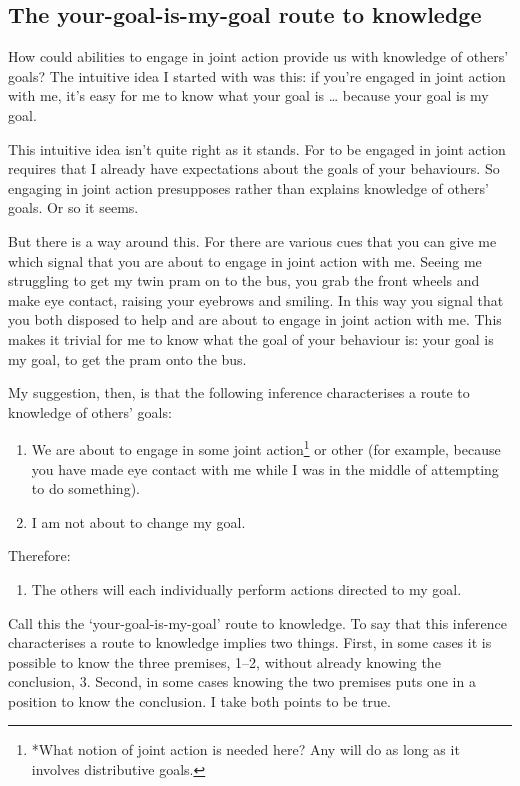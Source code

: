 \documentclass[12pt,a4paper]{extarticle}
\begin{document}
\subsection{The your-goal-is-my-goal route to knowledge}

How could abilities to engage in joint action provide us with knowledge of others’ goals?   The intuitive idea I started with was this: if you’re engaged in joint action with me, it’s easy for me to know what your goal is … because your goal is my goal.  

This intuitive idea isn’t quite right as it stands.  For to be engaged in joint action requires that I already have expectations about the goals of your behaviours.  
So engaging in joint action presupposes rather than explains knowledge of others’ goals.  Or so it seems.

But there is a way around this.  For there are various cues that you can give me which signal that you are about to engage in joint action with me.  Seeing me struggling to get my twin pram on to the bus, you grab the front wheels and make eye contact, raising your eyebrows and smiling.  In this way you signal that you both disposed to help and are about to engage in joint action with me.  This makes it trivial for me to know what the goal of your behaviour is: your goal is my goal, to get the pram onto the bus.

My suggestion, then, is that the following inference characterises a route to knowledge of others’ goals:
%
\begin{enumerate}
\item We are about to engage in some joint action\footnote{
*What notion of joint action is needed here?  Any will do as long as it involves distributive goals.
}
or other (for example, because you have made eye contact with me while I was in the middle of attempting to do something).

\item I am not about to change my goal.

\end{enumerate}
%
Therefore:
%
\begin{enumerate}[resume]
%
\item The others will each individually perform actions directed to my goal.
\end{enumerate}
%
Call this the ‘your-goal-is-my-goal’ route to knowledge.  To say that this inference characterises a route to knowledge implies two things.  First, in some cases it is possible to know the three premises, 1–2, without already knowing the conclusion, 3.  Second, in some cases knowing the two premises puts one in a position to know the conclusion.  I take both points to be true.
\end{document}
